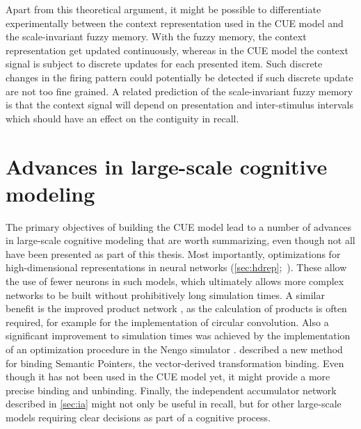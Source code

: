 Apart from this theoretical argument, it might be possible to differentiate experimentally between the context representation used in the CUE model and the scale-invariant fuzzy memory.
With the fuzzy memory, the context representation get updated continuously, whereas in the CUE model the context signal is subject to discrete updates for each presented item.
Such discrete changes in the firing pattern could potentially be detected if such discrete update are not too fine grained.
A related prediction of the scale-invariant fuzzy memory is that the context signal will depend on presentation and inter-stimulus intervals which should have an effect on the contiguity in recall.


\section{Advances in large-scale cognitive modeling}
The primary objectives of building the CUE model lead to a number of advances in large-scale cognitive modeling that are worth summarizing, even though not all have been presented as part of this thesis.
Most importantly, optimizations for high-dimensional representations in neural networks (\cref{sec:hdrep};\ \cite{gosmann216}).
These allow the use of fewer neurons in such models, which ultimately allows more complex networks to be built without prohibitively long simulation times.
A similar benefit is the improved product network \parencite{gosmann2015-1}, as the calculation of products is often required, for example for the implementation of circular convolution.
Also a significant improvement to simulation times was achieved by the implementation of an optimization procedure in the Nengo simulator \parencite{gosmann2017}.
 described a new method for binding Semantic Pointers, the vector-derived transformation binding.
Even though it has not been used in the CUE model yet, it might provide a more precise binding and unbinding.
Finally, the independent accumulator network described in \cref{sec:ia} might not only be useful in recall, but for other large-scale models requiring clear decisions as part of a cognitive process.
